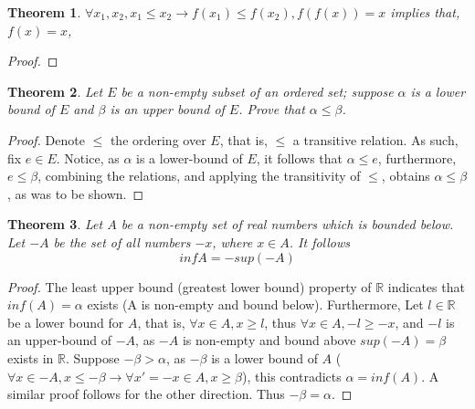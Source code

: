 \documentclass{amsart}
\numberwithin{equation}{section}
\theoremstyle{plain}
\newtheorem{thm}{Theorem}[section]
\theoremstyle{definition}
\begin{document}
\begin{thm}
    $ \forall x_1, x_2, x_1 \leq x_2 \rightarrow f(x_1) \leq f(x_2), f(f(x)) = x$ implies that, $f(x) = x$,
\end{thm}
\begin{proof}

\end{proof} 
\begin{thm}
  Let $E$ be a non-empty subset of an ordered set; suppose $\alpha$ is a lower bound of $E$
  and $\beta$ is an upper bound of $E$. Prove that $\alpha \leq \beta$.
\end{thm} 
  \begin{proof}
      Denote $\leq$ the ordering over $E$, that is, $\leq$ a transitive relation. As such, fix $e \in E$.
      Notice, as $\alpha$ is a lower-bound of $E$, it follows that $\alpha \leq e$, furthermore, 
      $e \leq \beta$, combining the relations, and applying the transitivity of $\leq$, 
      obtains $\alpha \leq \beta$, as was to be shown.
  \end{proof}
\begin{thm} 
  Let $A$ be a non-empty set of real numbers which is bounded below. Let $-A$ be the set of all numbers $-x$, where $x\in A$.
  It follows \begin{equation} inf A = -sup(-A) \end{equation}
\end{thm}
\begin{proof}
  The least upper bound (greatest lower bound) property of $\mathbb{R}$ indicates that $inf(A) = \alpha$ exists (A is non-empty and bound below). Furthermore,
  Let $l \in \mathbb{R}$ be a lower bound for $A$, that is, $\forall x \in A, x \geq l$, thus $\forall x \in A, -l \geq -x$, and $-l$ 
  is an upper-bound of $-A$, as $-A$ is non-empty and bound above $sup(-A) = \beta$ exists in $\mathbb{R}$.
  Suppose $-\beta  > \alpha$, as $-\beta$ is a lower bound of $A$ ($\forall x \in -A, x \leq -\beta \rightarrow \forall x' = -x \in A, x \geq \beta$), this contradicts $\alpha = inf(A)$. 
  A similar proof follows for the other direction. Thus $-\beta = \alpha$.
\end{proof}
\end{document}
